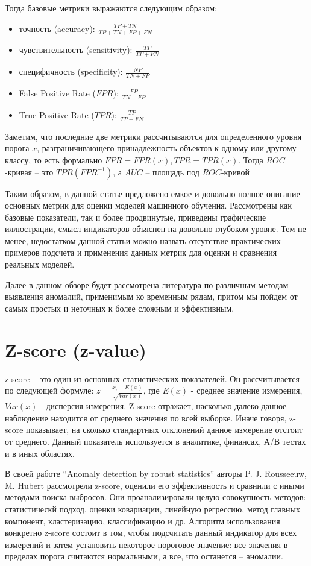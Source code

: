 \documentclass[14pt, letterpaper]{extarticle}
\begin{document}
Тогда базовые метрики выражаются следующим образом:
\begin{itemize} 
   \item точность (accuracy): $\frac{TP+TN}{TP+TN+FP+FN}$
   \item чувствительность (sensitivity): $\frac{TP}{TP+FN}$
   \item специфичность (specificity): $\frac{NP}{TN+FP}$
   \item False Positive Rate ($FPR$): $\frac{FP}{TN+FP}$
   \item True Positive Rate ($TPR$): $\frac{TP}{TP+FN}$ 
\end{itemize}


Заметим, что последние две метрики рассчитываются для определенного уровня порога $x$, разграничивающего принадлежность объектов к одному или другому классу, то есть формально $FPR=FPR(x), TPR=TPR(x)$. Тогда $ROC$-кривая – это $TPR(FPR^{-1})$, а $AUC$ – площадь под $ROC$-кривой

Таким образом, в данной статье предложено емкое и довольно полное описание основных метрик для оценки моделей машинного обучения. Рассмотрены как базовые показатели, так и более продвинутые, приведены графические иллюстрации, смысл индикаторов объяснен на довольно глубоком уровне. Тем не менее, недостатком данной статьи можно назвать отсутствие практических примеров подсчета и применения данных метрик для оценки и сравнения реальных моделей.

Далее в данном обзоре будет рассмотрена литература по различным методам выявления аномалий, применимым ко временным рядам, притом мы пойдем от самых простых и неточных к более сложным и эффективным.

\section{Z-score (z-value)}

z-score – это один из основных статистических показателей. Он рассчитывается по следующей формуле: $z=\frac{x_i-E(x)}{\sqrt{Var(x)}}$, где $E(x)$ - среднее значение измерения, $Var(x)$ - дисперсия измерения. Z-score отражает, насколько далеко данное наблюдение находится от среднего значения по всей выборке. Иначе говоря, z-score показывает, на сколько стандартных отклонений данное измерение отстоит от среднего. Данный показатель используется в аналитике, финансах, А/В тестах и в иных областях.

В своей работе “Anomaly detection by robust statistics” авторы P. J. Rousseeuw, M. Hubert \cite{rousseeuw2018anomaly} рассмотрели z-score, оценили его эффективность и сравнили с иными методами поиска выбросов. Они проанализировали целую совокупность методов: статистическй подход, оценки ковариации, линейную регрессию, метод главных компонент, кластеризацию, классификацию и др. Алгоритм использования конкретно z-score состоит в том, чтобы подсчитать данный индикатор для всех измерений и затем установить некоторое пороговое значение: все значения в пределах порога считаются нормальными, а все, что останется – аномалии. 
\end{document}
